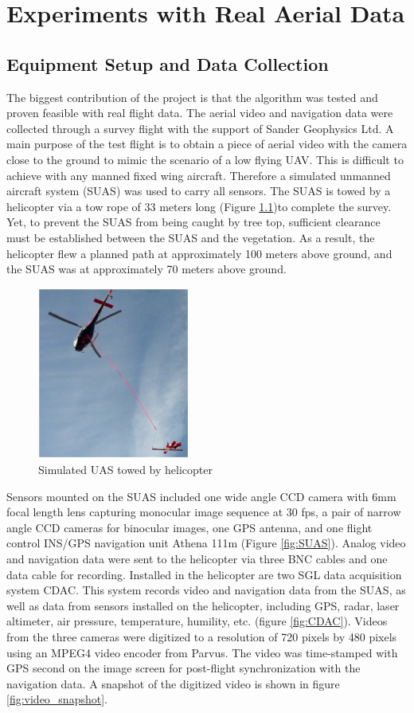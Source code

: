 \chapter{Experiments with Real Aerial Data}
\section{Equipment Setup and Data Collection}
The biggest contribution of the project is that the algorithm was
tested and proven feasible with real flight data. The aerial video and
navigation data were collected through a survey flight with the
support of Sander Geophysics Ltd. A main purpose of the test flight is
to obtain a piece of aerial video with the camera close to the ground
to mimic the scenario of a low flying UAV. This is difficult to
achieve with any manned fixed wing aircraft. Therefore a simulated
unmanned aircraft system (SUAS) was used to carry all sensors. The
SUAS is towed by a helicopter via a tow rope of 33 meters long
(Figure \ref{fig:towedSUAS})to complete the survey. Yet, to prevent
the SUAS from being caught by tree top, sufficient clearance must be
established between the SUAS and the vegetation. As a result, the helicopter
flew a planned path at approximately 100 meters above ground, and the SUAS
was at approximately 70 meters above ground.

\begin{figure}[h]
\centering
\includegraphics[width=5cm,keepaspectratio=true]{./Figures/towed_SUAS.jpg}
\caption{Simulated UAS towed by helicopter}
\label{fig:towedSUAS}
\end{figure}
\FloatBarrier

Sensors mounted on the SUAS included one wide angle CCD camera with
6mm focal length lens capturing monocular image sequence at 30 fps, a
pair of narrow angle CCD cameras for binocular images, one GPS
antenna, and one flight control INS/GPS navigation unit Athena 111m
\cite{_athena_????} (Figure \ref{fig:SUAS}). Analog video and
navigation data were sent to the helicopter via three BNC cables and
one data cable for recording. Installed in the helicopter are two SGL
data acquisition system CDAC. This system records video and navigation
data from the SUAS, as well as data from sensors installed on the
helicopter, including GPS, radar, laser altimeter, air pressure,
temperature, humility, etc. (figure \ref{fig:CDAC}). Videos from the
three cameras were digitized to a resolution of 720 pixels by 480
pixels using an MPEG4 video encoder from Parvus. The video was
time-stamped with GPS second on the image screen for post-flight
synchronization with the navigation data. A snapshot of the digitized
video is shown in figure \ref{fig:video_snapshot}.

